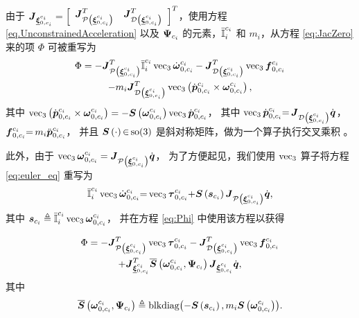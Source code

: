 由于 $\boldsymbol{J}_{\underline{\boldsymbol{\xi}}_{0,c_{i}}^{c_{i}}}=\left[\begin{array}{cc}
\boldsymbol{J}_{\operatorname{\mathcal{P}}\left(\underline{\boldsymbol{\xi}}_{0,c_{i}}^{c_{i}}\right)}^{T} & \boldsymbol{J}_{\operatorname{\mathcal{D}}\left(\underline{\boldsymbol{\xi}}_{0,c_{i}}^{c_{i}}\right)}^{T}\end{array}\right]^{T}$，使用方程 \eqref{eq.UnconstrainedAcceleration} 以及 $\boldsymbol{\Psi}_{c_{i}}$ 的元素，$\bar{\boldsymbol{\mathbb{I}}}_{i}^{c_{i}}$
和 $m_{i}$，从方程 \eqref{eq:JacZero} 来的项 $\Phi$ 可被重写为
\begin{multline}
\Phi=-\boldsymbol{J}_{\operatorname{\mathcal{P}}\left(\underline{\boldsymbol{\xi}}_{0,c_{i}}^{c_{i}}\right)}^{T}\bar{\boldsymbol{\mathbb{I}}}_{i}^{c_{i}}\operatorname{vec}_{3}\dot{\boldsymbol{\omega}}_{0,c_{i}}^{c_{i}}-\boldsymbol{J}_{\operatorname{\mathcal{D}}\left(\underline{\boldsymbol{\xi}}_{0,c_{i}}^{c_{i}}\right)}^{T}\operatorname{vec}_{3}\boldsymbol{f}_{0,c_{i}}^{c_{i}}\\
-m_{i}\boldsymbol{J}_{\operatorname{\mathcal{D}}\left(\underline{\boldsymbol{\xi}}_{0,c_{i}}^{c_{i}}\right)}^{T}\operatorname{vec}_{3}\left(\dot{\boldsymbol{p}}_{0,c_{i}}^{c_{i}}\times\boldsymbol{\omega}_{0,c_{i}}^{c_{i}}\right),\label{eq:Phi}
\end{multline}
其中 $\operatorname{vec}_{3}\left(\dot{\boldsymbol{p}}_{0,c_{i}}^{c_{i}}\times\boldsymbol{\omega}_{0,c_{i}}^{c_{i}}\right)=-\boldsymbol{S}\left(\boldsymbol{\omega}_{0,c_{i}}^{c_{i}}\right)\operatorname{vec}_{3}\dot{\boldsymbol{p}}_{0,c_{i}}^{c_{i}}$，
其中 $\operatorname{vec}_{3}\dot{\boldsymbol{p}}_{0,c_{i}}^{c_{i}}{=\,}\boldsymbol{J}_{\operatorname{\mathcal{D}}\left(\underline{\boldsymbol{\xi}}_{0,c_{i}}^{c_{i}}\right)}\dot{\boldsymbol{q}}$，
$\boldsymbol{f}_{0,c_{i}}^{c_{i}}{=\,}m_{i}\ddot{\boldsymbol{p}}_{0,c_{i}}^{c_{i}}$，
并且 $\boldsymbol{S}\left(\cdot\right){\in\,}\mathrm{so(3)}$ 是斜对称矩阵，做为一个算子执行交叉乘积 \cite{spong2006robot}。

此外，由于 $\operatorname{vec}_{3}\boldsymbol{\omega}_{0,c_{i}}^{c_{i}}=\boldsymbol{J}_{\operatorname{\mathcal{P}}\left(\underline{\boldsymbol{\xi}}_{0,c_{i}}^{c_{i}}\right)}\dot{\boldsymbol{q}}$，
为了方便起见，我们使用 $\operatorname{vec}_{3}$ 算子将方程 \eqref{eq:euler_eq} 重写为
\begin{equation}
\bar{\boldsymbol{\mathbb{I}}}_{i}^{c_{i}}\operatorname{vec}_{3}\dot{\boldsymbol{\omega}}_{0,c_{i}}^{c_{i}}{=}\operatorname{vec}_{3}\boldsymbol{\tau}_{0,c_{i}}^{c_{i}}{+}\boldsymbol{S}\left(\boldsymbol{s}_{c_{i}}\right)\boldsymbol{J}_{\operatorname{\mathcal{P}}\left(\underline{\boldsymbol{\xi}}_{0,c_{i}}^{c_{i}}\right)}\dot{\boldsymbol{q}},\label{eq:Euler_eq2}
\end{equation}
其中 $\boldsymbol{s}_{c_{i}}\triangleq\bar{\boldsymbol{\mathbb{I}}}_{i}^{c_{i}}\operatorname{vec}_{3}\boldsymbol{\omega}_{0,c_{i}}^{c_{i}}$，
并在方程 \eqref{eq:Phi} 中使用该方程以获得

\begin{multline}
\Phi=-\boldsymbol{J}_{\operatorname{\mathcal{P}}\left(\underline{\boldsymbol{\xi}}_{0,c_{i}}^{c_{i}}\right)}^{T}\operatorname{vec}_{3}\boldsymbol{\tau}_{0,c_{i}}^{c_{i}}-\boldsymbol{J}_{\operatorname{\mathcal{D}}\left(\underline{\boldsymbol{\xi}}_{0,c_{i}}^{c_{i}}\right)}^{T}\operatorname{vec}_{3}\boldsymbol{f}_{0,c_{i}}^{c_{i}}\\
+\boldsymbol{J}_{\underline{\boldsymbol{\xi}}_{0,c_{i}}^{c_{i}}}^{T}\overline{\boldsymbol{S}}\left(\boldsymbol{\omega}_{0,c_{i}}^{c_{i}},\boldsymbol{\Psi}_{c_{i}}\right)\boldsymbol{J}_{\underline{\boldsymbol{\xi}}_{0,c_{i}}^{c_{i}}}\dot{\boldsymbol{q}},\label{eq:Phi_final}
\end{multline}
其中
\begin{equation}
\overline{\boldsymbol{S}}\left(\boldsymbol{\omega}_{0,c_{i}}^{c_{i}},\boldsymbol{\Psi}_{c_{i}}\right)\triangleq\textrm{blkdiag\ensuremath{\left(-\boldsymbol{S}\left(\boldsymbol{s}_{c_{i}}\right),m_{i}\boldsymbol{S}\left(\boldsymbol{\omega}_{0,c_{i}}^{c_{i}}\right)\right)}}.\label{eq:SkewSymetricMatrix}
\end{equation}


